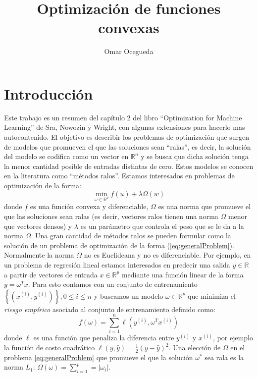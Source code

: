 \documentclass[12pt,draftcls, onecolumn, letterpaper,compsoc]{IEEEtran}
\begin{document}
\title{Optimizaci\'{o}n de funciones convexas}

\author{Omar Ocegueda}
\maketitle
\section{Introducci\'{o}n}
Este trabajo es un resumen del cap\'{i}tulo 2 del libro ``Optimization for Machine Learning'' de Sra, Nowozin y Wright, con algunas extensiones para hacerlo mas autocontenido. El objetivo es describir los problemas de optimizaci\'{o}n que surgen de modelos que promueven el que las soluciones sean ``ralas'', es decir, la soluci\'{o}n del modelo se codifica como un vector en $\mathbb{R}^{n}$ y se busca que dicha soluci\'{o}n tenga la menor cantidad posible de entradas distintas de cero. Estos modelos se conocen en la literatura como ``m\'{e}todos ralos''. Estamos interesados en problemas de optimizaci\'{o}n de la forma:
\begin{equation}\label{eq:generalProblem}
    \min_{\omega \in \mathbb{R}^{p}} f(u) + \lambda\Omega(w)
\end{equation}
donde $f$ es una funci\'{o}n convexa y diferenciable, $\Omega$ es una norma que promueve el que las soluciones sean ralas (es decir, vectores ralos tienen una norma $\Omega$ menor que vectores densos) y $\lambda$ es un par\'{a}metro que controla el peso que se le da a la norma $\Omega$. Una gran cantidad de m\'{e}todos ralos se pueden formular como la soluci\'{o}n de un problema de optimizaci\'{o}n de la forma (\ref{eq:generalProblem}). Normalmente la norma $\Omega$ no es Euclideana y no es diferenciable. Por ejemplo, en un problema de regresi\'{o}n lineal estamos interesados en predecir una salida $y\in \mathbb{R}$ a partir de vectores de entrada $x \in \mathbb{R}^{p}$ mediante una funci\'{o}n linear de la forma $y=\omega^{T}x$. Para esto contamos con un conjunto de entrenamiento $\left\lbrace (x^{(i)}, y^{(i)})\right\rbrace, 0\leq i \leq n$ y buscamos un modelo $\omega\in \mathbb{R}^{p}$ que minimiza el {\it riesgo emp\'{i}rico} asociado al conjunto de entrenamiento definido como:
\begin{equation}
    f(\omega) = \sum_{i=1}^{n} \ell(y^{(i)}, \omega^{T}x^{(i)})
\end{equation}
donde $\ell$ es una funci\'{o}n que penaliza la diferencia entre $y^{(i)}$ y $x^{(i)}$, por ejemplo la funci\'{o}n de costo cuadr\'{a}tico $\ell (y, \hat{y}) = \frac{1}{2}(y - \hat{y})^2$. Una elecci\'{o}n de $\Omega$ en el problema \ref{eq:generalProblem} que promueve el que la soluci\'{o}n $\omega^{*}$ sea rala es la norma $L_1$: $\Omega(\omega)=\sum_{i=1}^{p}=|\omega_i|$.\\
\end{document}
